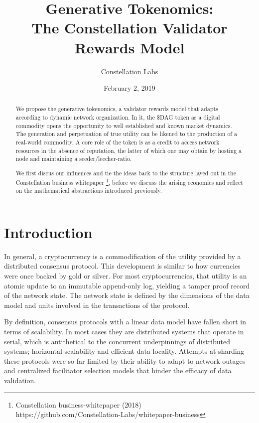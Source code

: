 \documentclass{article}
\title{Generative Tokenomics:\\ The Constellation Validator Rewards Model}
\author{Constellation Labs}
\date{February 2, 2019}
\begin{document}
\maketitle

\begin{abstract}
We propose the generative tokenomics, a validator rewards model that adapts according to dynamic network organization. In it, the \$DAG token as a digital commodity opens the opportunity to well established and known market dynamics. The generation and perpetuation of true utility can be likened to the production of a real-world commodity. A core role of the token is as a credit to access network resources in the absence of reputation, the latter of which one may obtain by hosting a node and maintaining a seeder/leecher-ratio.

We first discus our influences and tie the ideas back to the structure layed out in the Constellation business whitepaper
\footnote{Constellation business-whitepaper (2018)\\ https://github.com/Constellation-Labs/whitepaper-business}, 
before we discuss the arising economics and reflect on the mathematical abstractions introduced previously. 
\end{abstract}

\tableofcontents

\setcounter{secnumdepth}{0}
\section{Introduction}
In general, a cryptocurrency is a commodification of the utility provided by a distributed consensus protocol. This development is similar to how currencies were once backed by gold or silver. For most cryptocurrencies, that utility is an atomic update to an immutable append-only log, yielding a tamper proof record of the network state. The network state is defined by the dimensions of the data model and units involved in the transactions of the protocol. 

By definition, consensus protocols with a linear data model have fallen short in terms of scalability. In most cases they are distributed systems that operate in serial, which is antithetical to the concurrent underpinnings of distributed systems; horizontal scalability and efficient data locality. Attempts at sharding these protocols were so far limited by their ability to adapt to network outages and centralized facilitator selection models that hinder the efficacy of data validation. 
\end{document}
